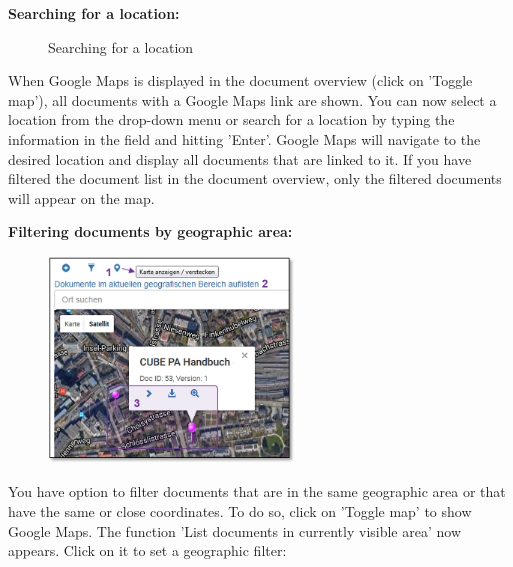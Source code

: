 \vspace{\baselineskip}

\textbf{Searching for a location:} 

\begin{figure}[H]
\caption{Searching for a location}
\end{figure}

When Google Maps is displayed in the document overview (click on 'Toggle map'), all documents with a Google Maps link are shown. You can now select a location from the drop-down menu  or search for a location  by typing the information in the field and hitting 'Enter'. Google Maps will navigate to the desired location and display all documents that are linked to it. If you have filtered the document list in the document overview, only the filtered documents will appear on the map. \newline

\pagebreak
\textbf{Filtering documents by geographic area:} \\

\begin{figure}
  \vspace{-35pt}
  \begin{center}
    \includegraphics[height=55mm]{../chapters/11_Dokumentenablage/pictures/11-2-3_GeoBereichFilter.jpg}
  \end{center}
  \vspace{-20pt}
  \vspace{-10pt}
\end{figure}
You have option to filter documents that are in the same geographic area or that have the same or close coordinates. To do so, click on 'Toggle map'  to show Google Maps. The function 'List documents in currently visible area'  now appears. Click on it to set a geographic filter:


